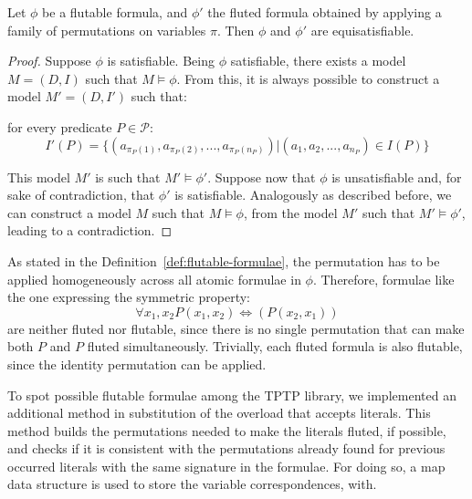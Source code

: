 \begin{lemma}
  Let \(\phi\) be a flutable formula, and \(\phi'\) the fluted formula obtained by applying a family of permutations on variables \(\pi\).
  Then \(\phi\) and \(\phi'\) are equisatisfiable.
\end{lemma}

\begin{proof}
  Suppose \(\phi\) is satisfiable.
  Being \(\phi\) satisfiable, there exists a model \(M = (D,I)\) such that \(M \models \phi\).
  From this, it is always possible to construct a model \(M' = (D,I')\) such that:
  
  for every predicate \(P \in \mathcal{P}\):
  \[I'(P) = \{(a_{\pi_P(1)}, a_{\pi_P(2)}, ..., a_{\pi_P(n_P)}) | (a_1, a_2, ..., a_{n_P}) \in I(P)\}\]

  This model \(M'\) is such that \(M' \models \phi'\).
  Suppose now that \(\phi\) is unsatisfiable and, for sake of contradiction, that \(\phi'\) is satisfiable.
  Analogously as described before, we can construct a model \(M\) such that \(M \models \phi\), from the model \(M'\) such that \(M' \models \phi'\), leading to a contradiction.
\end{proof}

As stated in the Definition~\ref{def:flutable-formulae}, the permutation has to be applied homogeneously across all atomic formulae in \(\phi\).
Therefore, formulae like the one expressing the symmetric property:
\[
  \forall x_1,x_2 P(x_1,x_2) \iff (P(x_2,x_1))
\]
are neither fluted nor flutable, since there is no single permutation that can make both \(P\) and \(P\) fluted simultaneously.
Trivially, each fluted formula is also flutable, since the identity permutation can be applied.

To spot possible flutable formulae among the TPTP library, we implemented an additional method  in substitution of the  overload that accepts literals.
This method builds the permutations needed to make the literals fluted, if possible, and checks if it is consistent with the permutations already found for previous occurred literals with the same signature in the formulae.
For doing so, a map data structure is used to store the variable correspondences, with.

